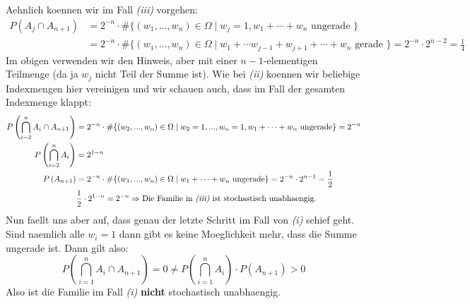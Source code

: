 \documentclass[a4paper]{article}
\newenvironment{Aufgabe}[2][Aufgabe]{\begin{trivlist}
\item[\hskip \labelsep {\bfseries #1}\hskip \labelsep {\bfseries #2.}]}{\end{trivlist}}
\begin{document}
\begin{Aufgabe}{5}
		Aehnlich koennen wir im Fall \textit{(iii)} vorgehen:
		\begin{align*}
			P\left(
				A_j \cap A_{n+1}
				\right) &= 2^{-n} \cdot \# \{
				(w_1, ..., w_n) \in \Omega \; \vert \;
				w_j = 1, w_1 + \cdots + w_n \text{ ungerade }
			\} \\
				&= 2^{-n} \cdot \# \{
					(w_1, ..., w_n) \in \Omega \; \vert \;
					w_1 + \cdots w_{j-1} + w_{j+1} + \cdots + w_n
					\text{ gerade }
				\} = 2^{-n} \cdot 2^{n-2} = \frac{ 1 }{ 4 }
		\end{align*}
		Im obigen verwenden wir den Hinweis, aber mit einer $n-1$-elementigen Teilmenge (da ja $w_j$ nicht
		Teil der Summe ist). Wie bei \textit{(ii)} koennen wir beliebige Indexmengen hier vereinigen
		und wir schauen auch, dass im Fall der gesamten Indexmenge klappt:
		\begin{align*}
			P\left(
				\bigcap_{i=2}^n A_i \cap A_{n+1}
			\right) &= 2^{-n} \cdot \# \{
				(w_2, ..., w_n) \in \Omega \; \vert \;
				w_2 = 1, ..., w_n = 1, w_1 + \cdots + w_n \text{ ungerade}
			\} = 2 ^{-n} \\
			P\left(
				\bigcap_{i=2}^n A_i
		\right) &= 2^{1-n} \\
			P \left(
				A_{n+1}
			\right) &= 2 ^{-n} \cdot \# \{
					(w_1, ..., w_n) \in \Omega \; \vert \;
					w_1 + \cdots + w_n \text{ ungerade}
				\} = 2^{-n} \cdot 2^{n-1} = \frac{ 1 }{ 2 }\\
					& \frac{ 1 }{ 2 } \cdot 2^{1-n} = 2^{-n}
					\Rightarrow \text{Die Familie in \textit{(iii)} ist stochastisch unabhaengig.}
		\end{align*}
		Nun faellt uns aber auf, dass genau der letzte Schritt im Fall von \textit{(i)} schief geht.
		Sind naemlich alle $w_i = 1$ dann gibt es keine Moeglichkeit mehr, dass die Summe ungerade ist.
		Dann gilt also:
		\[
			P\left(
				\bigcap_{i=1}^n A_i \cap A_{n+1}
			\right) = 0 \neq P\left(
				\bigcap_{i=1}^n A_i
			\right) \cdot P \left(
				A_{n+1}
			\right) > 0
		\] 
		Also ist die Familie im Fall \textit{(i)} \textbf{nicht} stochastisch unabhaengig.
	\end{Aufgabe}
\end{document}

